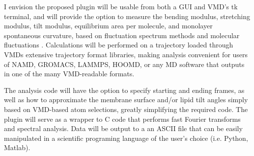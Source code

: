 I envision the proposed plugin will be usable from both a GUI and VMD’s tk terminal, and will provide the option to measure the bending modulus, stretching modulus, tilt modulus, equilibrium area per molecule, and monolayer spontaneous curvature, based on fluctuation spectrum methods \cite{Brannigan2006,Goetz1999} and molecular fluctuations \cite{Galimzyanov_Undulations_2017,Rawicz_Effect_2000,Pan_Effect_2009}. Calculations will be performed on a trajectory loaded through VMDs extensive trajectory format libraries, making analysis convenient for users of NAMD, GROMACS, LAMMPS, HOOMD, or any MD software that outputs in one of the many VMD-readable formats.

The analysis code will have the option to specify starting and ending frames, as well as how to approximate the membrane surface and/or lipid tilt angles simply based on VMD-based atom selections, greatly simplifying the required code. The plugin will serve as a wrapper to C code that performs fast Fourier transforms and spectral analysis. Data will be output to a an ASCII file that can be easily manipulated in a scientific programing language of the user’s choice (i.e. Python, Matlab).

